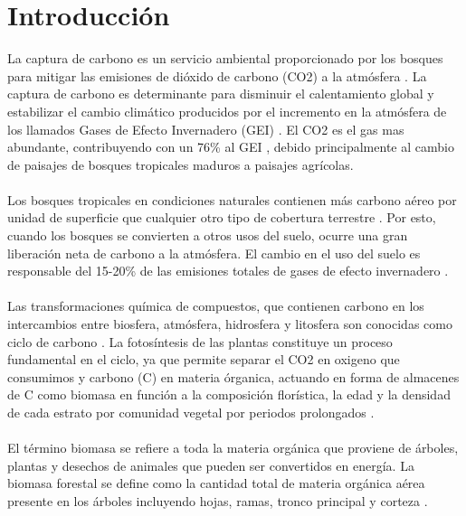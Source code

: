 \newpage{\ } 
\thispagestyle{empty} 

\chapter{Introducción}

La captura de carbono es un servicio ambiental proporcionado por los bosques para mitigar las emisiones de di\'oxido de carbono (CO2) a la atm\'osfera \cite{peralta2013analisis}. La captura de carbono es determinante para disminuir el calentamiento global y estabilizar el cambio clim\'atico producidos por el incremento en la atm\'osfera de los llamados Gases de Efecto Invernadero (GEI) \cite{marquezestimacion}. El CO2 es el gas mas abundante, contribuyendo con un 76\% al GEI \cite{avila2001almacenamiento}, debido principalmente al cambio de paisajes de bosques tropicales maduros a paisajes agr\'icolas.\\~\\
Los bosques tropicales en condiciones naturales contienen m\'as carbono a\'ereo por unidad de superficie que cualquier otro tipo de cobertura terrestre \cite{gibbs2007monitoring}. Por esto, cuando los bosques se convierten a otros usos del suelo, ocurre una gran liberaci\'on neta de carbono a la atm\'osfera. El cambio en el uso del suelo es responsable del 15-20\% de las emisiones totales de gases de efecto invernadero \cite{peralta2013analisis}.\\~\\
Las transformaciones química de compuestos, que contienen carbono en los intercambios entre biosfera, atm\'osfera, hidrosfera y litosfera son conocidas como ciclo de carbono \cite{wikixxx}. La fotosíntesis de las plantas constituye un proceso fundamental en el ciclo, ya que permite separar  el CO2 en oxigeno que consumimos y carbono (C) en materia \'organica, actuando en forma de almacenes de C como biomasa en función a la composición flor\'istica, la edad y la densidad de cada estrato por comunidad vegetal por periodos prolongados \cite{acosta2003diseno}.\\~\\
El t\'ermino biomasa se refiere a toda la materia org\'anica que proviene de \'arboles, plantas y desechos de animales que pueden ser convertidos en energ\'ia. La biomasa forestal se define como la cantidad total de materia org\'anica a\'erea presente en los \'arboles incluyendo hojas, ramas, tronco principal y corteza \cite{garzuglia2003wood}.\\~\\
